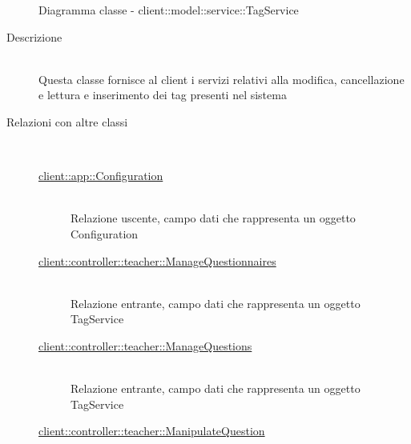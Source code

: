 \vspace{0.5cm}
\hypertarget{client::model::service::TagService}{}
\begin{figure}[H]
	\centering
	\caption{Diagramma classe - client::model::service::TagService}
\end{figure}\begin{description}
\item[Descrizione] \hfill \\
Questa classe fornisce al client i servizi relativi alla modifica, cancellazione e lettura e inserimento dei tag presenti nel sistema
\item[Relazioni con altre classi] \hfill \\
\vspace{-7mm}
\begin{description}
	\item[\hyperlink{client::app::Configuration}{client::app::Configuration}] \hfill \\
	Relazione uscente, campo dati che rappresenta un oggetto Configuration
	\item[\hyperlink{client::controller::teacher::ManageQuestionnaires}{client::controller::teacher::ManageQuestionnaires}] \hfill \\
	Relazione entrante, campo dati che rappresenta un oggetto TagService
	\item[\hyperlink{client::controller::teacher::ManageQuestions}{client::controller::teacher::ManageQuestions}] \hfill \\
	Relazione entrante, campo dati che rappresenta un oggetto TagService
	\item[\hyperlink{client::controller::teacher::ManipulateQuestion}{client::controller::teacher::ManipulateQuestion}] \hfill \\

\end{description}
\end{description}
